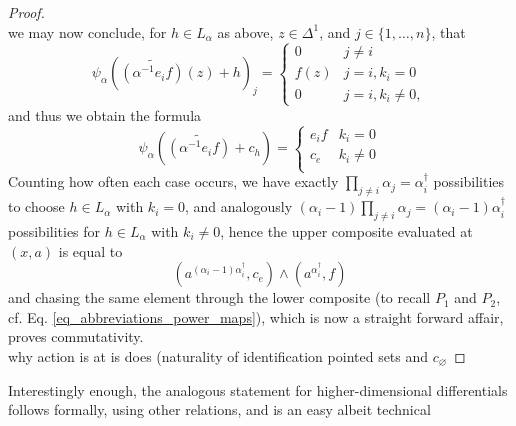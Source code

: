 \begin{prop}
\begin{proof}
\[        \]
      we may now conclude, for $h \in L_\alpha$ as above, $z \in \Delta^1$, and $j \in \{1,\ldots,n\}$, that
        \[	\psi_\alpha( \widetilde{(\alpha^{-1} e_i f)}(z) + h )_j = %
          {\left\{
            \begin{array}{ll}
              0 & j \neq i\\
              f(z) & j = i, k_i = 0\\
              0 & j=i, k_i \neq 0,
            \end{array}
          \right.}
        \]
      and thus we obtain the formula
        \[
          \psi_\alpha( \widetilde{(\alpha^{-1} e_i f)} + c_h ) = %
          {\left\{
            \begin{array}{ll}
              e_i f & k_i = 0\\
              c_e & k_i \neq 0\\
            \end{array}
          \right.}
        \]
      Counting how often each case occurs, we have exactly $\prod_{j \neq i} \alpha_j = \alpha^\dagger_i$ possibilities to choose $h \in L_\alpha$ with $k_i = 0$, and analogously $(\alpha_i - 1) \prod_{j \neq i} \alpha_j = (\alpha_i - 1) \alpha^\dagger_i$ possibilities for $h \in L_\alpha$ with $k_i \neq 0$, hence the upper composite evaluated at $(x,a)$ is equal to
        \[ (a^{(\alpha_i - 1) \alpha^\dagger_i},c_e) \wedge (a^{\alpha^\dagger_i},f) \]
      and chasing the same element through the lower composite (to recall $P_1$ and $P_2$, cf. Eq. \ref{eq_abbreviations_power_maps}), which is now a straight forward affair, proves commutativity.\\
       why action is at is does (naturality of identification pointed sets and $c_\varnothing$
    \end{proof}
  \end{prop}
  Interestingly enough, the analogous statement for higher-dimensional differentials follows formally, using other relations, and is an easy albeit technical

